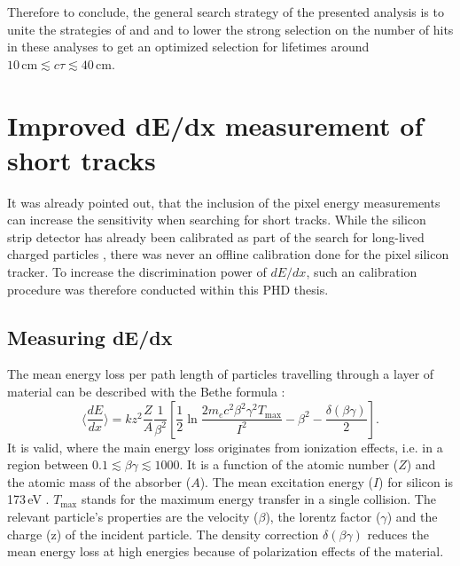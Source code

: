 Therefore to conclude, the general search strategy of the presented analysis is to unite the strategies of \cite{bib:CMS:HSCP_8TeV} and \cite{bib:CMS:DT_8TeV} and to lower the strong selection on the number of hits in these analyses 
to get an optimized selection for lifetimes around $10\,\text{cm} \lesssim c\tau \lesssim  40\,\text{cm}$.
\section{Improved dE/dx measurement of short tracks}
\label{sec:DeDxMeasurement}
It was already pointed out, that the inclusion of the pixel energy measurements can increase the sensitivity when searching for short tracks.
While the silicon strip detector has already been calibrated as part of the search for long-lived charged particles \cite{bib:CMS:HSCP_8TeV}, there was never an offline calibration done for the pixel silicon tracker.
To increase the discrimination power of $dE/dx$, such an calibration procedure was therefore conducted within this PHD thesis.
 
\subsection{Measuring dE/dx}
\label{sec:sub:MeasuringDeDx}
The mean energy loss per path length of particles travelling through a layer of material can be described with the Bethe formula \cite{bib:Bethe_1930}:
\begin{equation*}
\langle \frac{dE}{dx} \rangle = kz^2\frac{Z}{A}\frac{1}{\beta^2} [ \frac{1}{2} \ln{\frac{2m_e c^2 \beta^2 \gamma^2 T_{\text{max}}}{I^2}} - \beta^2 - \frac{\delta( \beta \gamma )}{2} ].
\end{equation*}
It is valid, where the main energy loss originates from ionization effects, i.e. in a region between $0.1\lesssim\beta\gamma\lesssim 1000$.
It is a function of the atomic number ($Z$) and the atomic mass of the absorber ($A$). 
The mean excitation energy ($I$) for silicon is 173\,eV \cite{bib:NIST}. 
$T_{\text{max}}$ stands for the maximum energy transfer in a single collision.
The relevant particle's properties are the velocity ($\beta$), the lorentz factor ($\gamma$) and the charge (z) of the incident particle.
The density correction $\delta( \beta \gamma )$ reduces the mean energy loss at high energies because of polarization effects of the material.

